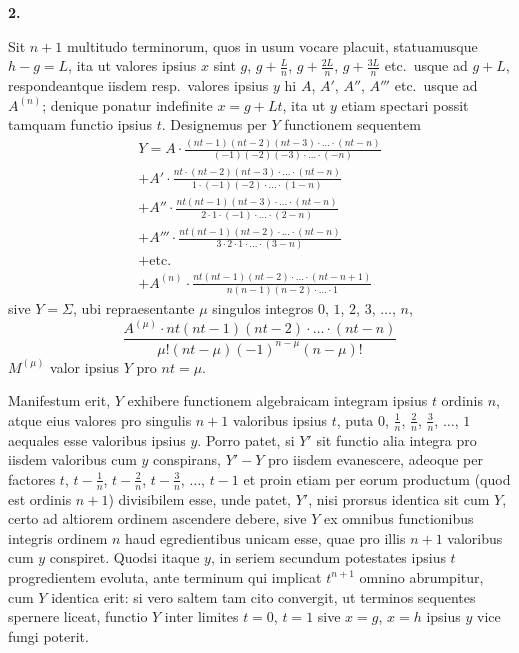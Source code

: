 \documentclass[12pt,a4paper]{article}
\newcommand{\art}[1]{\par\medskip\noindent\textbf{#1.}\par\nopagebreak\smallskip}
\begin{document}
\art{2}

Sit $n+1$ multitudo terminorum, quos in usum vocare placuit, statuamusque $h-g=L$, ita ut valores ipsius $x$ sint $g$, $g+\frac{L}{n}$, $g+\frac{2L}{n}$, $g+\frac{3L}{n}$ etc.\ usque ad $g+L$, respondeantque iisdem resp.\ valores ipsius $y$ hi $A$, $A'$, $A''$, $A'''$ etc.\ usque ad $A^{(n)}$; denique ponatur indefinite $x=g+Lt$, ita ut $y$ etiam spectari possit tamquam functio ipsius $t$. Designemus per $Y$ functionem sequentem
\begin{multline*}
Y = A\cdot\frac{(nt-1)(nt-2)(nt-3)\cdot\ldots\cdot(nt-n)}{(-1)(-2)(-3)\cdot\ldots\cdot(-n)}\\
+ A'\cdot\frac{nt\cdot(nt-2)(nt-3)\cdot\ldots\cdot(nt-n)}{1\cdot(-1)(-2)\cdot\ldots\cdot(1-n)}\\
+ A''\cdot\frac{nt(nt-1)(nt-3)\cdot\ldots\cdot(nt-n)}{2\cdot1\cdot(-1)\cdot\ldots\cdot(2-n)}\\
+ A'''\cdot\frac{nt(nt-1)(nt-2)\cdot\ldots\cdot(nt-n)}{3\cdot2\cdot1\cdot\ldots\cdot(3-n)}\\
+ \text{etc.}\\
+ A^{(n)}\cdot\frac{nt(nt-1)(nt-2)\cdot\ldots\cdot(nt-n+1)}{n(n-1)(n-2)\cdot\ldots\cdot1}
\end{multline*}
sive $Y=\Sigma$, ubi repraesentante $\mu$ singulos integros $0$, $1$, $2$, $3$, $\ldots$, $n$,
\[
\frac{A^{(\mu)}\cdot nt(nt-1)(nt-2)\cdot\ldots\cdot(nt-n)}{\mu!(nt-\mu)(-1)^{n-\mu}(n-\mu)!}
\]
$M^{(\mu)}$ valor ipsius $Y$ pro $nt=\mu$.

Manifestum erit, $Y$ exhibere functionem algebraicam integram ipsius $t$ ordinis $n$, atque eius valores pro singulis $n+1$ valoribus ipsius $t$, puta $0$, $\frac{1}{n}$, $\frac{2}{n}$, $\frac{3}{n}$, $\ldots$, $1$ aequales esse valoribus ipsius $y$. Porro patet, si $Y'$ sit functio alia integra pro iisdem valoribus cum $y$ conspirans, $Y'-Y$ pro iisdem evanescere, adeoque per factores $t$, $t-\frac{1}{n}$, $t-\frac{2}{n}$, $t-\frac{3}{n}$, $\ldots$, $t-1$ et proin etiam per eorum productum (quod est ordinis $n+1$) divisibilem esse, unde patet, $Y'$, nisi prorsus identica sit cum $Y$, certo ad altiorem ordinem ascendere debere, sive $Y$ ex omnibus functionibus integris ordinem $n$ haud egredientibus unicam esse, quae pro illis $n+1$ valoribus cum $y$ conspiret. Quodsi itaque $y$, in seriem secundum potestates ipsius $t$ progredientem evoluta, ante terminum qui implicat $t^{n+1}$ omnino abrumpitur, cum $Y$ identica erit: si vero saltem tam cito convergit, ut terminos sequentes spernere liceat, functio $Y$ inter limites $t=0$, $t=1$ sive $x=g$, $x=h$ ipsius $y$ vice fungi poterit.
\end{document}

